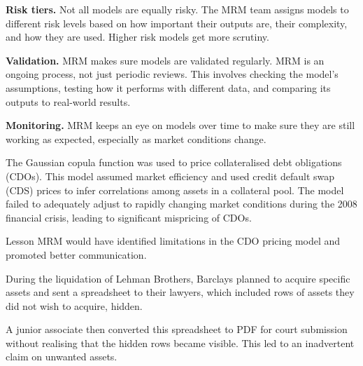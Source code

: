 \begin{lettered}
\item \textbf{Risk tiers.} Not all models are equally risky. The MRM team assigns
models to different risk levels based on how important their outputs are, their
complexity, and how they are used. Higher risk models get more scrutiny.
\item \textbf{Validation.} MRM makes sure models are validated regularly. MRM is
an ongoing process, not just periodic reviews. This involves checking the model's
assumptions, testing how it performs with different data, and comparing its
outputs to real-world results.
\item \textbf{Monitoring.} MRM keeps an eye on models over time to make sure they
are still working as expected, especially as market conditions change.
\end{lettered}




The Gaussian copula function was used to price collateralised debt obligations
(CDOs). This model assumed market efficiency and used credit default swap (CDS)
prices to infer correlations among assets in a collateral pool. The model failed
to adequately adjust to rapidly changing market conditions during the 2008
financial crisis, leading to significant mispricing of CDOs.

\begin{orexambox}{Lesson}
MRM would have identified limitations in the CDO pricing model and promoted
better communication.
\end{orexambox}


\begin{lettered}
\item During the liquidation of Lehman Brothers, Barclays planned to acquire
specific assets and sent a spreadsheet to their lawyers, which included rows of
assets they did not wish to acquire, hidden.
\item A junior associate then converted this spreadsheet to PDF for court
submission without realising that the hidden rows became visible. This led to an
inadvertent claim on unwanted assets.
\end{lettered}

